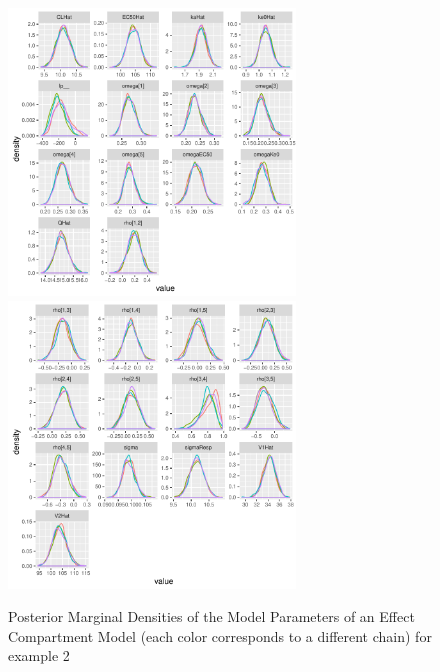 \documentclass[10pt, reqno, oneside]{amsbook}
\numberwithin{equation}{chapter}
\numberwithin{figure}{chapter}
\numberwithin{table}{chapter}
\theoremstyle{remark}
\begin{document}
\begin{figure}[!htb]
  \includegraphics[width=3.0in,trim=0in 0in 0 0in]{graphics/effCptModelTorsten_0.82/effCptPlots006.pdf}
  \includegraphics[width=3.0in,trim=0in 0in 0 0in]{graphics/effCptModelTorsten_0.82/effCptPlots007.pdf}
  \caption{{Posterior Marginal Densities of the Model Parameters of an Effect Compartment Model (each color corresponds to a different chain) for example 2}}
  \label{effCptModelDens}
\end{figure}
\end{document}
